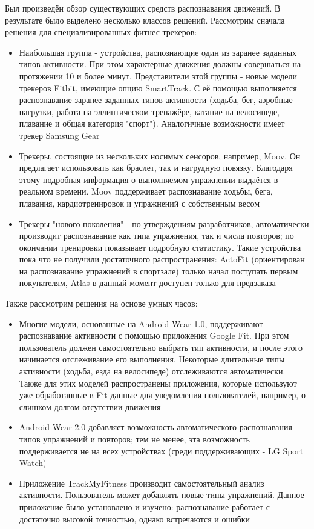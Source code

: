 Был произведён обзор существующих средств распознавания движений. В результате было выделено несколько классов решений. Рассмотрим сначала решения для специализированных фитнес-трекеров:
\begin{itemize}
\item Наибольшая группа - устройства, распознающие один из заранее заданных типов активности. При этом характерные движения должны совершаться на протяжении 10 и более минут. Представители этой группы - новые модели трекеров Fitbit, имеющие опцию SmartTrack. С её помощью выполняется распознавание заранее заданных типов активности (ходьба, бег, аэробные нагрузки, работа на эллиптическом тренажёре, катание на велосипеде, плавание и общая категория "спорт"). Аналогичные возможности имеет трекер Samsung Gear
\item Трекеры, состоящие из нескольких носимых сенсоров, например, Moov. Он предлагает использовать как браслет, так и нагрудную повязку. Благодаря этому подробная информация о выполняемом упражнении выдаётся в реальном времени. Moov поддерживает распознавание ходьбы, бега, плавания, кардиотренировок и упражнений с собственным весом
\item Трекеры "нового поколения" - по утверждениям разработчиков, автоматически производит распознавание как типа упражнения, так и числа повторов; по окончании тренировки показывает подробную статистику. Такие устройства пока что не получили достаточного распространения: ActoFit (ориентирован на распознавание упражнений в спортзале) только начал поступать первым покупателям, Atlas в данный момент доступен только для предзаказа
\end{itemize}

Также рассмотрим решения на основе умных часов:
\begin{itemize}
\item Многие модели, основанные на Android Wear 1.0, поддерживают распознавание активности с помощью приложения Google Fit. При этом пользователь должен самостоятельно выбрать тип активности, и после этого начинается отслеживание его выполнения. Некоторые длительные типы активности (ходьба, езда на велосипеде) отслеживаются автоматически. Также для этих моделей распространены приложения, которые используют уже обработанные в Fit данные для уведомления пользователей, например, о слишком долгом отсутствии движения
\item Android Wear 2.0 добавляет возможность автоматического распознавания типов упражнений и повторов; тем не менее, эта возможность поддерживается не на всех устройствах (среди поддерживающих - LG Sport Watch)
\item Приложение TrackMyFitness производит самостоятельный анализ активности. Пользователь может добавлять новые типы упражнений. Данное приложение было установлено и изучено: распознавание работает с достаточно высокой точностью, однако встречаются и ошибки
\end{itemize}


